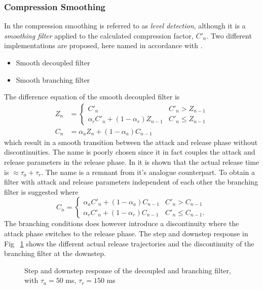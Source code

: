 \documentclass[../main2.tex]{subfiles}
\providecommand{\rootdir}{..}
\begin{document}
 \subsubsection{Compression Smoothing}
In \cite{reiss2012tutorial} the compression smoothing is referred to as \emph{level detection}, although it is a \emph{smoothing filter} applied to the calculated compression factor, $C'_n$. Two different implementations are proposed, here named in accordance with \cite{reiss2012tutorial}.
\begin{itemize}
\item{Smooth decoupled filter}
\item{Smooth branching filter}
\end{itemize}
The difference equation of the smooth decoupled filter is
\begin{equation}
\begin{split}
Z_n &= \begin{cases}
   C'_n								& C'_n > Z_{n-1} \\
    \alpha_{r} C'_n + (1-\alpha_{r}) Z_{n-1} 	& C'_n \leq Z_{n-1}
\end{cases} \\
C_n &= \alpha_{a} Z_n + (1-\alpha_{a}) C_{n-1}
\end{split}
\end{equation}
which result in a smooth transition between the attack and release phase without discontinuities. The name is poorly chosen since it in fact couples the attack and release parameters in the release phase. In \cite{reiss2012tutorial} it is shown that the actual release time is $\approx \tau_a + \tau_r$. The name is a remnant from it's analogue counterpart. To obtain a filter with attack and release parameters independent of each other the branching filter is suggested where 
\begin{equation}
C_n = \begin{cases}
    \alpha_{a} C'_n + (1-\alpha_{a}) C_{n-1} 	& C'_n > C_{n-1} \\
    \alpha_{r} C'_n + (1-\alpha_{r}) C_{n-1} 	& C'_n \leq C_{n-1}.
\end{cases}
\end{equation}
The branching conditions does however introduce a discontinuity where the attack phase switches to the release phase. The step and downstep response in Fig ~\ref{fig:step_reiss_filter} shows the different actual release trajectories and the discontinuity of the branching filter at the downstep.
\begin{figure}
\centerline{}
\caption{Step and downstep response of the decoupled and branching filter, with $\tau_a = 50$ ms, $\tau_r = 150$ ms}
\label{fig:step_reiss_filter}
\end{figure}
\end{document}
